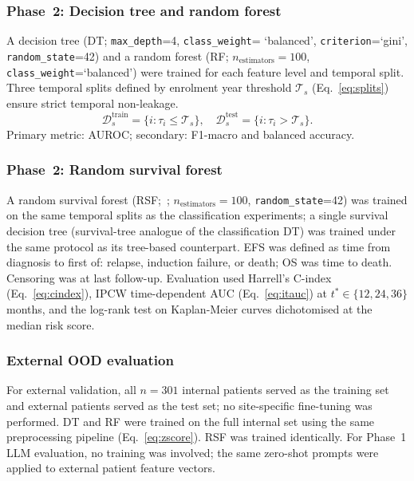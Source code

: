 \documentclass[pdflatex,sn-nature]{sn-jnl}
\begin{document}
\subsubsection{Phase~2: Decision tree and random forest}\label{sec:dt}

A decision tree (DT; \texttt{max\_depth}=4, \texttt{class\_weight}=%
`balanced', \texttt{criterion}=`gini', \texttt{random\_state}=42)
and a random forest (RF; $n_\text{estimators}=100$,
\texttt{class\_weight}=`balanced') were trained for each feature level
and temporal split.
Three temporal splits defined by enrolment year threshold $\mathcal{T}_s$
(Eq.~\ref{eq:splits}) ensure strict temporal non-leakage.
\begin{equation}
\mathcal{D}_s^{\text{train}} = \{i : \tau_i \leq \mathcal{T}_s\},
\quad
\mathcal{D}_s^{\text{test}} = \{i : \tau_i > \mathcal{T}_s\}.
\label{eq:splits}
\end{equation}
Primary metric: AUROC; secondary: F1-macro and balanced accuracy.

\subsubsection{Phase~2: Random survival forest}\label{sec:rsf}

A random survival forest (RSF;~\cite{[CITE:Ishwaran2008]};
$n_\text{estimators}=100$, \texttt{random\_state}=42) was trained on
the same temporal splits as the classification experiments; a single
survival decision tree (survival-tree analogue of the classification DT)
was trained under the same protocol as its tree-based counterpart.
EFS was defined as time from diagnosis to first of: relapse, induction
failure, or death; OS was time to death.
Censoring was at last follow-up.
Evaluation used Harrell's C-index (Eq.~\ref{eq:cindex}), IPCW
time-dependent AUC (Eq.~\ref{eq:itauc}) at $t^*\in\{12,24,36\}$
months, and the log-rank test on Kaplan-Meier curves dichotomised at
the median risk score.

\subsubsection{External OOD evaluation}\label{sec:ood}

For external validation, all $n=301$ internal patients served as the
training set and external patients served as the test set; no
site-specific fine-tuning was performed.
DT and RF were trained on the full internal set using the same
preprocessing pipeline (Eq.~\ref{eq:zscore}).
RSF was trained identically.
For Phase~1 LLM evaluation, no training was involved; the same
zero-shot prompts were applied to external patient feature vectors.
\end{document}
